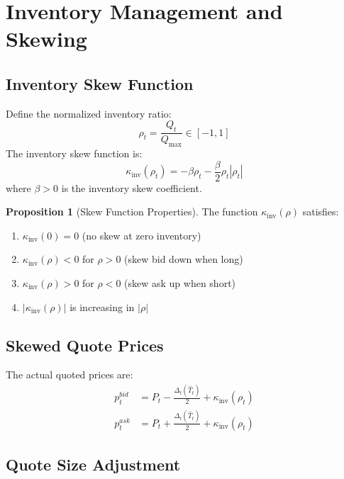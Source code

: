 \documentclass[11pt]{article}
\theoremstyle{definition}
\newtheorem{proposition}{Proposition}[section]
\begin{document}
\section{Inventory Management and Skewing}

\subsection{Inventory Skew Function}

Define the normalized inventory ratio:
\begin{equation}
\rho_t = \frac{Q_t}{Q_{\max}} \in [-1, 1]
\end{equation}
The inventory skew function is:
\begin{equation}
\kappa_{\text{inv}}(\rho_t) = -\beta \rho_t - \frac{\beta}{2} \rho_t |\rho_t|
\end{equation}
where $\beta > 0$ is the inventory skew coefficient.

\begin{proposition}[Skew Function Properties]
The function $\kappa_{\text{inv}}(\rho)$ satisfies:
\begin{enumerate}
\item $\kappa_{\text{inv}}(0) = 0$ (no skew at zero inventory)
\item $\kappa_{\text{inv}}(\rho) < 0$ for $\rho > 0$ (skew bid down when long)
\item $\kappa_{\text{inv}}(\rho) > 0$ for $\rho < 0$ (skew ask up when short)
\item $|\kappa_{\text{inv}}(\rho)|$ is increasing in $|\rho|$
\end{enumerate}
\end{proposition}

\subsection{Skewed Quote Prices}

The actual quoted prices are:
\begin{align}
p_t^{bid} &= P_t - \frac{\Delta_t(\hat{T}_t)}{2} + \kappa_{\text{inv}}(\rho_t) \\
p_t^{ask} &= P_t + \frac{\Delta_t(\hat{T}_t)}{2} + \kappa_{\text{inv}}(\rho_t)
\end{align}

\subsection{Quote Size Adjustment}
\end{document}
